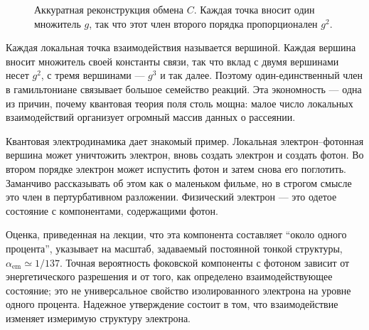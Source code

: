 \begin{figure}[htbp]
\centering
{}
\caption{Аккуратная реконструкция обмена \(C\). Каждая точка вносит один множитель \(g\), так что этот член второго порядка пропорционален \(g^2\).}
\end{figure}

Каждая локальная точка взаимодействия называется вершиной. Каждая вершина вносит множитель своей константы связи, так что вклад с двумя вершинами несет \(g^2\), с тремя вершинами — \(g^3\) и так далее. Поэтому один-единственный член в гамильтониане связывает большое семейство реакций. Эта экономность — одна из причин, почему квантовая теория поля столь мощна: малое число локальных взаимодействий организует огромный массив данных о рассеянии.

\begin{classroomqa}
\end{classroomqa}

Квантовая электродинамика дает знакомый пример. Локальная электрон--фотонная вершина может уничтожить электрон, вновь создать электрон и создать фотон. Во втором порядке электрон может испустить фотон и затем снова его поглотить. Заманчиво рассказывать об этом как о маленьком фильме, но в строгом смысле это член в пертурбативном разложении. Физический электрон — это одетое состояние с компонентами, содержащими фотон.

Оценка, приведенная на лекции, что эта компонента составляет ``около одного процента'', указывает на масштаб, задаваемый постоянной тонкой структуры, \(\alpha_{\mathrm{em}}\simeq 1/137\). Точная вероятность фоковской компоненты с фотоном зависит от энергетического разрешения и от того, как определено взаимодействующее состояние; это не универсальное свойство изолированного электрона на уровне одного процента. Надежное утверждение состоит в том, что взаимодействие изменяет измеримую структуру электрона.

